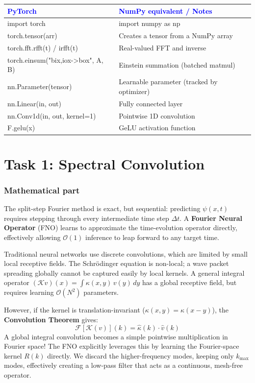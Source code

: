 \documentclass[11pt]{article}
\begin{document}
\begin{center}
\renewcommand{\arraystretch}{1.3}
\begin{tabularx}{\textwidth}{@{} >{\ttfamily\small}l X @{}}
\toprule
\textcolor{blue}{PyTorch} & \textcolor{blue}{NumPy equivalent / Notes} \\ \midrule
import torch & import numpy as np \\
torch.tensor(arr) & Creates a tensor from a NumPy array \\
torch.fft.rfft(t) / irfft(t) & Real-valued FFT and inverse \\
torch.einsum("bix,iox->box", A, B) & Einstein summation (batched matmul) \\
nn.Parameter(tensor) & Learnable parameter (tracked by optimizer) \\
nn.Linear(in, out) & Fully connected layer \\
nn.Conv1d(in, out, kernel=1) & Pointwise 1D convolution \\
F.gelu(x) & GeLU activation function \\
\bottomrule
\end{tabularx}
\end{center}

\section*{Task 1: Spectral Convolution}

\subsubsection*{Mathematical part}
The split-step Fourier method is exact, but sequential: predicting $\psi(x, t)$ requires stepping through every intermediate time step $\Delta t$. A \textbf{Fourier Neural Operator} (FNO) learns to approximate the time-evolution operator directly, effectively allowing $\mathcal{O}(1)$ inference to leap forward to any target time.

Traditional neural networks use discrete convolutions, which are limited by small local receptive fields. The Schrödinger equation is non-local; a wave packet spreading globally cannot be captured easily by local kernels. A general integral operator $(\mathcal{K}v)(x) = \int \kappa(x, y)\,v(y)\,dy$ has a global receptive field, but requires learning $\mathcal{O}(N^2)$ parameters.

However, if the kernel is translation-invariant ($\kappa(x, y) = \kappa(x-y)$), the \textbf{Convolution Theorem} gives:
$$
\mathcal{F}[\mathcal{K}(v)](k) = \hat{\kappa}(k) \cdot \hat{v}(k)
$$
A global integral convolution becomes a simple pointwise multiplication in Fourier space! The FNO explicitly leverages this by learning the Fourier-space kernel $R(k)$ directly. We discard the higher-frequency modes, keeping only $k_{\text{max}}$ modes, effectively creating a low-pass filter that acts as a continuous, mesh-free operator.
\end{document}
